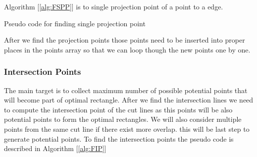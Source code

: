 \documentclass[a4paper,17pt]{article}
\begin{document}
Algorithm [\ref{alg:FSPP}] is to single projection point of a point to a edge.

\begin{algorithm}
    \caption{Pseudo code for finding single projection point}
    \label{alg:FSPP}
    \begin{algorithmic}[1]
            \Else
                \State {}
            \EndIf 
            \EndProcedure
    \end{algorithmic}
\end{algorithm}

After we find the projection points those points need to be inserted into proper places in the points array so that we can loop though the new points one by one. 

\subsubsection{Intersection Points}
The main target is to collect maximum number of possible potential points that will become part of optimal rectangle. After we find the intersection lines we need to compute the intersection point of the cut lines as this points will be also potential points to form the optimal rectangles. We will also consider multiple points from the same cut line if there exist more overlap. this will be last step to generate potential points. To find the intersection points the pseudo code is described in Algorithm [\ref{alg:FIP}]
\end{document}
